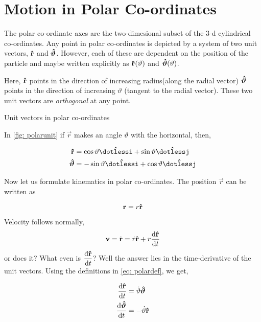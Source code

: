 \section{Motion in Polar Co-ordinates}

The polar co-ordinate axes are the two-dimesional subset of the 3-d cylindrical co-ordinates. 
Any point in polar co-ordinates is depicted by a system of two unit vectors, \(\boldsymbol{\mathbf{\hat{r}}}\) and
\(\boldsymbol{\mathbf{\hat{\vartheta}}}\). However, each of these are {dependent on the position of the particle} and
maybe written explicitly as \(\boldsymbol{\mathbf{\hat{r}}}(\vartheta)\) and \(\boldsymbol{\mathbf{\hat{\vartheta}}}(\vartheta)\).  

Here, \(\boldsymbol{\mathbf{\hat{r}}}\) points in the direction of increasing radius(along the radial vector)
\(\boldsymbol{\mathbf{\hat{\vartheta}}}\) points in the direction of increasing \(\vartheta\) (tangent to the radial vector).
These two unit vectors are \emph{orthogonal} at any point. 

\begin{marginfigure}
    \caption{Unit vectors in polar co-ordinates}
    \label{fig: polarunit}
\end{marginfigure}

In \cref{fig: polarunit} if \(\vec{r}\) makes
an angle \(\vartheta\) with the horizontal, then,

\begin{align}
    \label{eq: polardef}
    \unitv{r} &= \cos \vartheta \ihat + \sin \vartheta \jhat\\
    \unitv{\vartheta} &= -\sin \vartheta \ihat + \cos \vartheta \jhat
\end{align}

Now let us formulate kinematics in polar co-ordinates. The position \(\vec{r}\) can be written as

\begin{equation}
    \boldsymbol{\mathbf{r}} = r \boldsymbol{\mathbf{\hat{r}}}
\end{equation}

\noindent Velocity follows normally, 
\begin{equation}
    \boldsymbol{\mathbf{v}} = \dot{\boldsymbol{\mathbf{r}}} = \dot{r} \boldsymbol{\mathbf{\hat{r}}} + r\dv{\boldsymbol{\mathbf{\hat{r}}}}{t} 
\end{equation}
or does it? What even is \(\displaystyle\dv{\boldsymbol{\mathbf{\hat{r}}}}{t}\)? Well the answer lies in 
the time-derivative of the unit vectors. Using the definitions in \eqref{eq: polardef}, we get,

\begin{align}
    \dv{\boldsymbol{\mathbf{\hat{r}}}}{t} &= \dot{\vartheta} \boldsymbol{\mathbf{\hat{\vartheta}}}\\
    \dv{\boldsymbol{\mathbf{\hat{\vartheta}}}}{t} &= -\dot{\vartheta} \boldsymbol{\mathbf{\hat{r}}}
\end{align}


